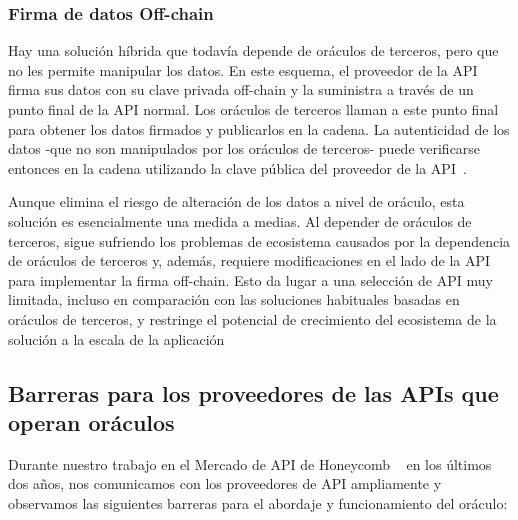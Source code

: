 \documentclass[11pt]{article}
\begin{document}
\subsubsection{Firma de datos Off-chain}
\label{sec:off-chain-signing-of-data}

Hay una solución híbrida que todavía depende de oráculos de terceros, pero que no les permite manipular los datos. En este esquema, el proveedor de la API firma sus datos con su clave privada off-chain y la suministra a través de un punto final de la API normal. Los oráculos de terceros llaman a este punto final para obtener los datos firmados y publicarlos en la cadena. La autenticidad de los datos -que no son manipulados por los oráculos de terceros- puede verificarse entonces en la cadena utilizando la clave pública del proveedor de la API~\cite{open-price-feed}.

Aunque elimina el riesgo de alteración de los datos a nivel de oráculo, esta solución es esencialmente una medida a medias. Al depender de oráculos de terceros, sigue sufriendo los problemas de ecosistema causados por la dependencia de oráculos de terceros y, además, requiere modificaciones en el lado de la API para implementar la firma off-chain. Esto da lugar a una selección de API muy limitada, incluso en comparación con las soluciones habituales basadas en oráculos de terceros, y restringe el potencial de crecimiento del ecosistema de la solución a la escala de la aplicación

\subsection{Barreras para los proveedores de las APIs que operan oráculos}
\label{sec:barriers-to-api-providers-operating-oracles}

Durante nuestro trabajo en el Mercado de API de Honeycomb ~\cite{benligiray:2019} 
en los últimos dos años, nos comunicamos con los proveedores de API ampliamente y observamos las siguientes barreras para el abordaje y funcionamiento del oráculo:
\end{document}
